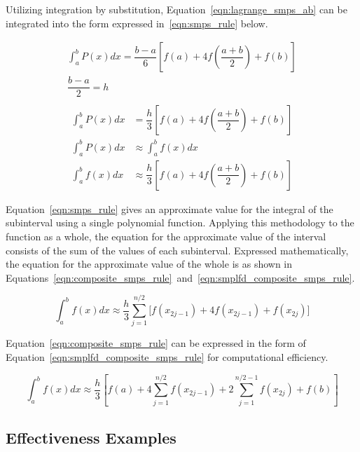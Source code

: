 \documentclass{paper}
\begin{document}
\noindent
Utilizing integration by substitution, Equation~\ref{eqn:lagrange_smps_ab} can be integrated into the form expressed in~\eqref{eqn:smps_rule} below.

\begin{gather}
\int_a^b P(x) dx = \dfrac{b - a}{6} \left[f(a) + 4f\left(\dfrac{a + b}{2}\right) + f(b)\right]                          \\
\dfrac{b - a}{2} = h                                                                                                    \\
\end{gather}
\begin{align}
    \int_a^b P(x) dx &= \dfrac{h}{3} \left[f(a) + 4f\left(\dfrac{a + b}{2}\right) + f(b)\right]                         \\
    \int_a^b P(x) dx &\approx \int_a^b f(x) dx                                                                          \\
    \int_a^b f(x) dx &\approx \dfrac{h}{3} \left[f(a) + 4f\left(\dfrac{a + b}{2}\right) + f(b)\right]  \label{eqn:smps_rule}
\end{align}


\noindent
Equation~\ref{eqn:smps_rule} gives an approximate value for the integral of the subinterval using a single polynomial function.
Applying this methodology to the function as a whole, the equation for the approximate value of the interval consists of the sum of the values of each subinterval.
Expressed mathematically, the equation for the approximate value of the whole is as shown in Equations~\ref{eqn:composite_smps_rule}~and~\ref{eqn:smplfd_composite_smps_rule}.

\begin{equation}
    \label{eqn:composite_smps_rule}
    \int_a^b f(x) dx \approx \dfrac{h}{3} \sum_{j=1}^{n / 2} \biggl[f(x_{2j-1}) + 4f(x_{2j-1}) + f(x_{2j})\biggr]
\end{equation}

\noindent
Equation~\ref{eqn:composite_smps_rule} can be expressed in the form of Equation~\ref{eqn:smplfd_composite_smps_rule} for computational efficiency.

\begin{equation}
    \label{eqn:smplfd_composite_smps_rule}
    \int_a^b f(x) dx \approx \dfrac{h}{3} \left[f(a) + 4 \sum_{j=1}^{n / 2} f(x_{2j-1}) + 2  \sum_{j=1}^{n / 2 - 1} f(x_{2j}) + f(b)\right]
\end{equation}

\subsection{Effectiveness Examples}
\end{document}
